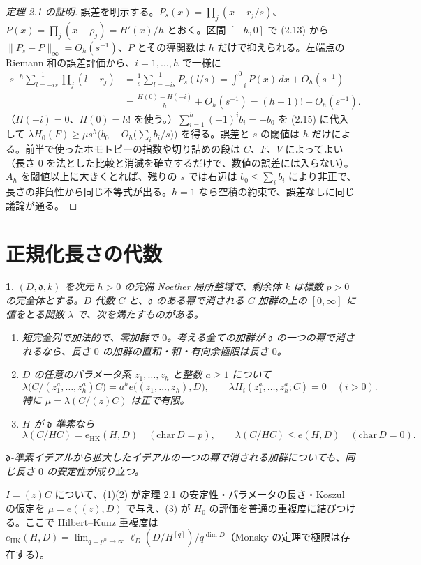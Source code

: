 \documentclass[11pt,a4paper]{ltjsarticle}
\newcommand{\stmtname}{}
\theoremstyle{plain}
\newtheorem*{stmtgen}{\stmtname}
\newenvironment{stmt}[1]{\renewcommand{\stmtname}{#1}\begin{stmtgen}}{\end{stmtgen}}
\theoremstyle{definition}
\newcommand{\dd}{\mathfrak{d}}
\newcommand{\eHK}{e_{\mathrm{HK}}}
\begin{document}
\begin{proof}[定理 2.1 の証明]
誤差を明示する。$P_s(x) = \prod_j(x-r_j/s)$、$P(x) = \prod_j(x-\rho_j) = H'(x)/h$ とおく。区間 $[-h,0]$ で (2.13) から $\|P_s-P\|_\infty = O_h(s^{-1})$、$P$ とその導関数は $h$ だけで抑えられる。左端点の Riemann 和の誤差評価から、$i = 1,\dots,h$ で一様に
\begin{align*}
  s^{-h}\sum_{l=-is}^{-1}\prod_j(l-r_j) &= \frac1s\sum_{l=-is}^{-1}P_s(l/s)
  = \int_{-i}^0P(x)\,dx+O_h(s^{-1})\\
  &= \frac{H(0)-H(-i)}{h}+O_h(s^{-1}) = (h-1)!+O_h(s^{-1}).
\end{align*}
（$H(-i) = 0$、$H(0) = h!$ を使う。）$\sum_{i=1}^h(-1)^ib_i = -b_0$ を (2.15) に代入して
$\lambda H_0(F)\ge\mu s^h\bigl(b_0-O_h\bigl(\sum_ib_i/s\bigr)\bigr)$
を得る。誤差と $s$ の閾値は $h$ だけによる。前半で使ったホモトピーの指数や切り詰めの段は $C$、$F$、$V$ によってよい（長さ $0$ を法とした比較と消滅を確立するだけで、数値の誤差には入らない）。$A_h$ を閾値以上に大きくとれば、残りの $s$ では右辺は $b_0\le\sum_ib_i$ により非正で、長さの非負性から同じ不等式が出る。$h = 1$ なら空積の約束で、誤差なしに同じ議論が通る。
\end{proof}
\section{正規化長さの代数}\label{sec:length}

\begin{stmt}{定理 3.1}
$(D,\dd,k)$ を次元 $h>0$ の完備 Noether 局所整域で、剰余体 $k$ は標数 $p>0$ の完全体とする。$D$ 代数 $C$ と、$\dd$ のある冪で消される $C$ 加群の上の $[0,\infty]$ に値をとる関数 $\lambda$ で、次を満たすものがある。
\begin{enumerate}
  \item 短完全列で加法的で、零加群で $0$。考える全ての加群が $\dd$ の一つの冪で消されるなら、長さ $0$ の加群の直和・和・有向余極限は長さ $0$。
  \item $D$ の任意のパラメータ系 $z_1,\dots,z_h$ と整数 $a\ge1$ について
  \[
    \lambda\bigl(C/(z_1^a,\dots,z_h^a)C\bigr) = a^he\bigl((z_1,\dots,z_h),D\bigr),\qquad
    \lambda H_i(z_1^a,\dots,z_h^a;C) = 0\quad(i>0).
  \]
  特に $\mu = \lambda(C/(z)C)$ は正で有限。
  \item $H$ が $\dd$-準素なら
  \[
    \lambda(C/HC) = \eHK(H,D)\quad(\mathrm{char}\,D = p),\qquad
    \lambda(C/HC)\le e(H,D)\quad(\mathrm{char}\,D = 0).
  \]
\end{enumerate}
$\dd$-準素イデアルから拡大したイデアルの一つの冪で消される加群についても、同じ長さ $0$ の安定性が成り立つ。
\end{stmt}
$I = (z)C$ について、(1)(2) が定理 2.1 の安定性・パラメータの長さ・Koszul の仮定を $\mu = e((z),D)$ で与え、(3) が $H_0$ の評価を普通の重複度に結びつける。ここで Hilbert--Kunz 重複度は
$\eHK(H,D) = \lim_{q = p^n\to\infty}\ell_D(D/H^{[q]})/q^{\dim D}$（Monsky の定理で極限は存在する）。
\end{document}
